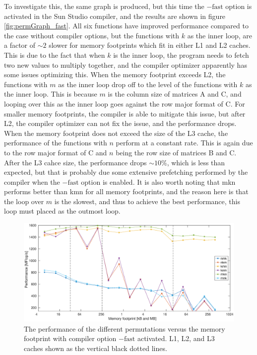 To investigate this, the same graph is produced, but this time the $\mathrm{-fast}$ option is activated in the Sun Studio compiler, and the results are shown in figure \ref{fig:permGraph_fast}. All six functions have improved performance compared to the case without compiler options, but the functions with $k$ as the inner loop, are a factor of $\sim 2$  slower for memory footprints which fit in either L1 and L2 caches. This is due to the fact that when $k$ is the inner loop, the program needs to fetch two new values to multiply together, and the compiler optimizer apparently has some issues optimizing this. When the memory footprint exceeds L2, the functions with $m$ as the inner loop drop off to the level of the functions with $k$ as the inner loop. This is because $m$ is the column size of matrices A and C, and looping over this as the inner loop goes against the row major format of C. For smaller memory footprints, the compiler is able to mitigate this issue, but after L2, the compiler optimizer can not fix the issue, and the performance drops. When the memory footprint does not exceed the size of the L3 cache, the performance of the functions with $n$ perform at a constant rate. This is again due to the row major format of C and $n$ being the row size of matrices B and C. After the L3 cahce size, the performance drops $\sim 10 \%$, which is less than expected, but that is probably due some extensive prefetching performed by the compiler when the $\mathrm{-fast}$ option is enabled. It is also worth noting that mkn performs better than kmn for all memory footprints, and the reason here is that the loop over $m$ is the slowest, and thus to achieve the best performance, this loop must placed as the outmost loop.

\begin{figure}
\centering
\includegraphics[width = 1.1\textwidth]{fig/permGraph_fast.eps}
\caption{The performance of the different permutations versus the memory footprint with compiler option $\mathrm{-fast}$ activated. L1, L2, and L3 caches shown as the vertical black dotted lines.}
\label{fig:comp1}
\end{figure}



